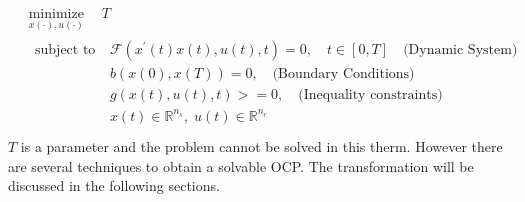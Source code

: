 \begin{equation}
    \begin{aligned}
    &\underset{x(\cdot), u(\cdot)}{\operatorname{minimize}} \quad T \\
    &\begin{aligned}
        {\text { subject to }} \;
        & \mathcal{F}(x^{\prime}(t)x(t),u(t),t)=0, \quad t \in[0, T] \quad \text{(Dynamic System)}\\
        & b(x(0),x(T))=0, \quad \text{(Boundary Conditions)}\\
        & g(x(t),u(t),t)>=0, \quad \text{(Inequality constraints)}\\
        & x(t) \in \mathbb{R}^{n_s}, \; u(t) \in \mathbb{R}^{n_c}
    \end{aligned}\\
    \end{aligned}
\end{equation}
%
$T$ is a parameter and the problem cannot be solved in this therm. However there are several techniques to obtain a solvable OCP. The transformation will be discussed in the following sections.